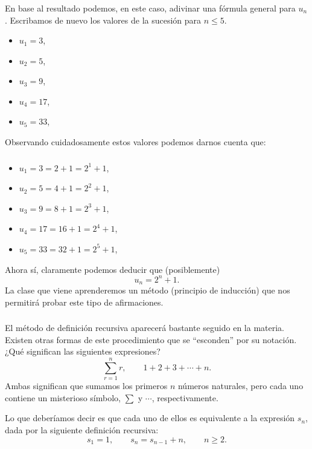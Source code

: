 \documentclass[handout]{beamer} %
\begin{document}
\begin{frame}\frametitle{} 
 En base al resultado podemos,  en este caso, adivinar una fórmula general para $u_n$. Escribamos de nuevo los valores de la sucesión para $n \le 5$. 
 
 \medspace \pause 
 
 \begin{itemize}
  	\item $ u_1=3$, \pause 
 	\item $u_2=5$,\pause 
 	\item $u_{3} = 9$,\pause 
 	\item $u_{4} = 17$,\pause 
 	\item $u_{5} = 33$,
\end{itemize}

\medspace 
\pause 
\pause Observando cuidadosamente estos valores podemos darnos cuenta que:
	
\end{frame}

\begin{frame}\frametitle{} 

	\begin{itemize}
		\item $ u_1=3 = 2 +1 = 2^1 + 1$, \pause 
		\item $u_2=5 = 4 +1 = 2^2 + 1$,\pause 
		\item $u_{3} = 9 = 8 +1 = 2^3 + 1$,\pause 
		\item $u_{4} = 17 = 16 +1 = 2^4 + 1$,\pause 
		\item $u_{5} = 33 = 32 +1 = 2^5 + 1$,\pause 
	\end{itemize}
\medspace 

Ahora sí,  claramente podemos deducir que (posiblemente) 
$$u_{n} =  2^n + 1.$$ \pause 
La clase que viene aprenderemos un método (principio de inducción) que nos permitirá probar este tipo de afirmaciones. 
	
\end{frame}



\begin{frame}\frametitle{} 
	El método de definición recursiva aparecerá bastante seguido en la materia. Existen otras formas de este procedimiento que se ``esconden'' por su notación. \pause ¿Qué significan las siguientes expresiones?
	$$
	\sum_{r=1}^{n} r,\qquad 1+2+3+\cdots +n.
	$$\pause 
	Ambas significan que sumamos los primeros $n$ números naturales, pero cada uno contiene un misterioso símbolo, $\sum$ y $\cdots$,
	respectivamente. 
	
	\medspace 
	\pause 
	Lo que deberíamos decir es que cada uno de ellos
	es equivalente a la expresión $s_n$, dada por la siguiente
	definición recursiva:\pause 
	$$
	s_1= 1, \qquad s_n = s_{n-1} + n, \qquad n\ge 2.
	$$
	
	
\end{frame}
\end{document}
